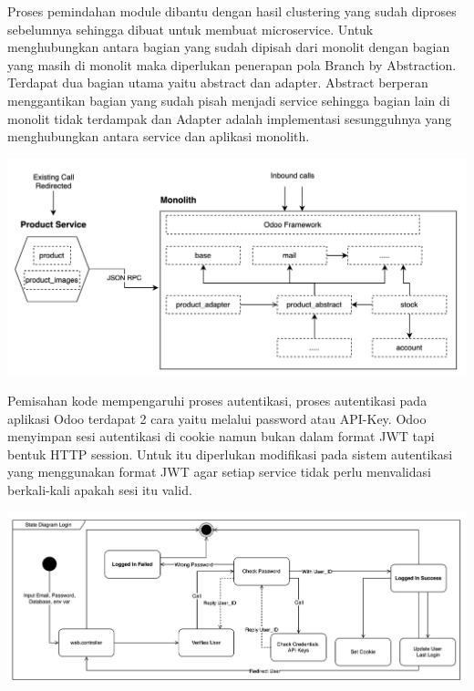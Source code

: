 Proses pemindahan module dibantu dengan hasil clustering yang sudah diproses sebelumnya sehingga dibuat untuk membuat microservice. Untuk menghubungkan antara bagian yang sudah dipisah dari monolit dengan bagian yang masih di monolit maka diperlukan penerapan pola Branch by Abstraction. Terdapat dua bagian utama yaitu abstract dan adapter. Abstract berperan menggantikan bagian yang sudah pisah menjadi service sehingga bagian lain di monolit tidak terdampak dan Adapter adalah implementasi sesungguhnya yang menghubungkan antara service dan aplikasi monolith.
\begin{center}
	\includegraphics[width=14cm]{img/bab_3/strangelExMicro.png}
	\label{fig:asd}
\end{center}
Pemisahan kode mempengaruhi proses autentikasi, proses autentikasi pada aplikasi Odoo terdapat 2 cara yaitu melalui password atau API-Key. Odoo menyimpan sesi autentikasi di cookie namun bukan dalam format JWT tapi bentuk HTTP session. Untuk itu diperlukan modifikasi pada sistem autentikasi yang menggunakan format JWT agar setiap service tidak perlu menvalidasi berkali-kali apakah sesi itu valid. 
\begin{center}
	\includegraphics[width=14cm]{img/bab_3/stateDiagramLogin.png}
	\label{fig:asd}
\end{center}


